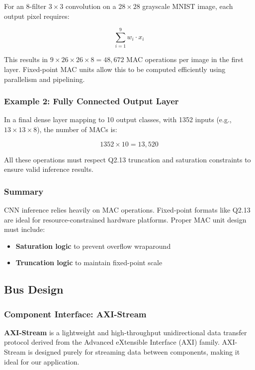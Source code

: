 \documentclass{article}
\begin{document}
For an 8-filter $3 \times 3$ convolution on a $28 \times 28$ grayscale MNIST image, each output pixel requires:

\[
\sum_{i=1}^{9} w_i \cdot x_i
\]

This results in $9 \times 26 \times 26 \times 8 = 48,672$ MAC operations per image in the first layer. Fixed-point MAC units allow this to be computed efficiently using parallelism and pipelining.

\subsubsection*{Example 2: Fully Connected Output Layer}

In a final dense layer mapping to 10 output classes, with 1352 inputs (e.g., $13 \times 13 \times 8$), the number of MACs is:

\[
1352 \times 10 = 13,520
\]

All these operations must respect Q2.13 truncation and saturation constraints to ensure valid inference results.

\subsubsection*{Summary}

CNN inference relies heavily on MAC operations. Fixed-point formats like Q2.13 are ideal for resource-constrained hardware platforms. Proper MAC unit design must include:

\begin{itemize}
    \item \textbf{Saturation logic} to prevent overflow wraparound
    \item \textbf{Truncation logic} to maintain fixed-point scale
\end{itemize}

\subsection{Bus Design}
\subsubsection{Component Interface: AXI-Stream}
\textbf{AXI-Stream} is a lightweight and high-throughput unidirectional data transfer protocol derived from the Advanced eXtensible Interface (AXI) family. AXI-Stream is designed purely for streaming data between components, making it ideal for our application.
\end{document}
